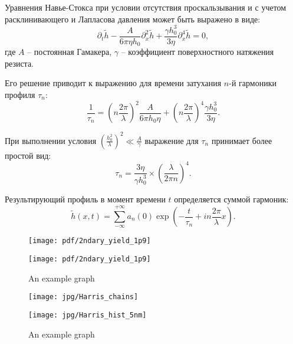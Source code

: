 Уравнения Навье-Стокса при условии отсутствия проскальзывания и с учетом расклинивающего и Лапласова давления может быть выражено в виде:
\begin{equation}
	\partial_t \tilde{h}-\frac{A}{6 \pi \eta h_0} \partial_x^2 \tilde{h}+\frac{\gamma h_0^3}{3 \eta} \partial_x^4 \tilde{h} = 0,
\end{equation}
где $A$ -- постоянная Гамакера, $\gamma$ -- коэффициент поверхностного натяжения резиста.

Его решение приводит к выражению для времени затухания $n$-й гармоники профиля $\tau_n$:
\begin{equation}
	\frac{1}{\tau_n}=\left(n \frac{2 \pi}{\lambda}\right)^2 \frac{A}{6 \pi h_0 \eta}+\left(n \frac{2 \pi}{\lambda}\right)^4 \frac{\gamma h_0^3}{3 \eta}.
\end{equation}

При выполнении условия $\left(\frac{\displaystyle h_0^2}{\displaystyle \lambda}\right)^2 \ll \frac{\displaystyle A}{\displaystyle \gamma}$ выражение для $\tau_n$ принимает более простой вид:
\begin{equation}
	\tau_n=\frac{3 \eta}{\gamma h_0^3} \times\left(\frac{\lambda}{2 \pi n}\right)^4.
\end{equation}

Результирующий профиль в момент времени $t$ определяется суммой гармоник:
\begin{equation}
	\tilde{h}(x, t)=\sum_{-\infty}^{+\infty} a_n(0) \exp \left(-\frac{t}{\tau_n}+i n \frac{2 \pi}{\lambda} x\right).
\end{equation}


\begin{figure}
	\begin{minipage}{0.5\textwidth}
		\raggedright
		\texttt{[image: pdf/2ndary\_yield\_1p9]}
	\end{minipage}%
	\begin{minipage}{0.5\textwidth}
		\raggedleft
		\texttt{[image: pdf/2ndary\_yield\_1p9]}
	\end{minipage}%
	\caption{An example graph}
\end{figure}


\begin{figure}
	\begin{minipage}{0.5\textwidth}
		\raggedright
		\texttt{[image: jpg/Harris\_chains]}
	\end{minipage}%
	\begin{minipage}{0.5\textwidth}
		\raggedleft
		\texttt{[image: jpg/Harris\_hist\_5nm]}
	\end{minipage}%
	\caption{An example graph}
\end{figure}